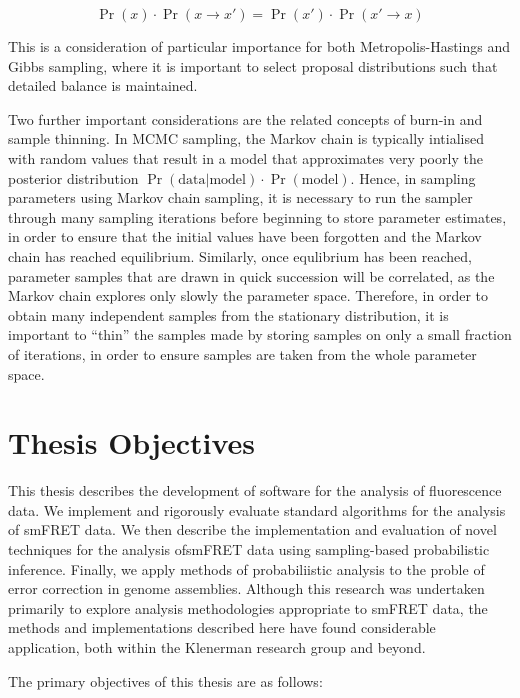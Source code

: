 \begin{equation}
\Pr(x)\cdot\Pr(x \rightarrow x') = \Pr(x')\cdot\Pr(x' \rightarrow x)
\label{eq:balance}
\end{equation}

This is a consideration of particular importance for both Metropolis-Hastings and Gibbs sampling, where it is important to select proposal distributions such that detailed balance is maintained.

Two further important considerations are the related concepts of burn-in and sample thinning. In MCMC sampling, the Markov chain is typically intialised with random values that result in a model that approximates very poorly the posterior distribution $\Pr(\text{data}|\text{model}) \cdot \Pr(\text{model})$. Hence, in sampling parameters using Markov chain sampling, it is necessary to run the sampler through many sampling iterations before beginning to store parameter estimates, in order to ensure that the initial values have been forgotten and the Markov chain has reached equilibrium. Similarly, once equlibrium has been reached, parameter samples that are drawn in quick succession will be correlated, as the Markov chain explores only slowly the parameter space. Therefore, in order to obtain many independent samples from the stationary distribution, it is important to ``thin'' the samples made by storing samples on only a small fraction of iterations, in order to ensure samples are taken from the whole parameter space.    

\section{Thesis Objectives}
This thesis describes the development of software for the analysis of fluorescence data. We implement and rigorously evaluate standard algorithms for the analysis of smFRET data. We then describe the implementation and evaluation of novel techniques for the analysis ofsmFRET data using sampling-based probabilistic inference. Finally, we apply methods of probabiliistic analysis to the proble of error correction in genome assemblies. Although this research was undertaken primarily to explore analysis methodologies appropriate to smFRET data, the methods and implementations described here have found considerable application, both within the Klenerman research group and beyond.

The primary objectives of this thesis are as follows:

